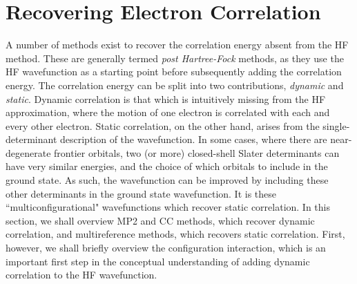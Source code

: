 \section{Recovering Electron Correlation}\label{section: methods_postHF}
A number of methods exist to recover the correlation energy absent from the \ac{HF} method. These are generally termed \textit{post Hartree-Fock} methods, as they use the \ac{HF} wavefunction as a starting point before subsequently adding the correlation energy. The correlation energy can be split into two contributions, \textit{dynamic} and \textit{static}. Dynamic correlation is that which is intuitively missing from the \ac{HF} approximation, where the motion of one electron is correlated with each and every other electron. Static correlation, on the other hand, arises from the single-determinant description of the wavefunction. In some cases, where there are near-degenerate frontier orbitals, two (or more) closed-shell Slater determinants can have very similar energies, and the choice of which orbitals to include in the ground state.\cite{Cramer2002} As such, the wavefunction can be improved by including these other determinants in the ground state wavefunction. It is these ``multiconfigurational" wavefunctions which recover static correlation. In this section, we shall overview \acf{MP2} and \ac{CC} methods, which recover dynamic correlation, and multireference methods, which recovers static correlation. First, however, we shall briefly overview the configuration interaction, which is an important first step in the conceptual understanding of adding dynamic correlation to the \ac{HF} wavefunction. 
